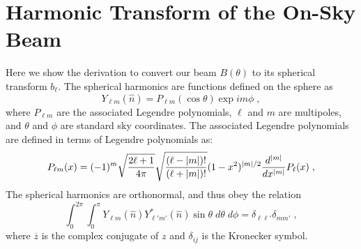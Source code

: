 \chapter{Harmonic Transform of the On-Sky Beam}
\label{app:trans} 

Here we show the derivation to convert our beam $B(\theta)$ to its spherical transform $b_\ell$. The spherical harmonics are functions defined on the sphere as
\begin{equation}
    Y_{\ell m}(\hat{n}) = P_{\ell m}(\cos\theta)\exp{i m\phi} \; ,
\end{equation}
where $P_{\ell m}$ are the associated Legendre polynomials, $\ell$ and $m$ are multipoles, and $\theta$ and $\phi$ are standard sky coordinates. The associated Legendre polynomials are defined in terms of Legendre polynomials as:
\begin{equation}
    P_{\ell m}(x) = (-1)^m\sqrt{\frac{2\ell+1}{4\pi}}\sqrt{\frac{(\ell-\abs{m})!}{(\ell+\abs{m})!}}(1-x^2)^{\abs{m}/2}\frac{d^{\abs{m}}}{dx^{\abs{m}}}P_\ell(x) \; ,
\end{equation}  
The spherical harmonics are orthonormal, and thus obey the relation
\begin{equation}
    \int_0^{2\pi}\int_0^{\pi} Y_{\ell m}(\hat{n})Y_{\ell'm'}^{*}(\hat{n}) \sin\theta \; d\theta\; d\phi = \delta_{\ell\ell'}\delta_{mm'} \; ,
\end{equation}
where $\overline{z}$ is the complex conjugate of $z$ and $\delta_{ij}$ is the Kronecker symbol.

